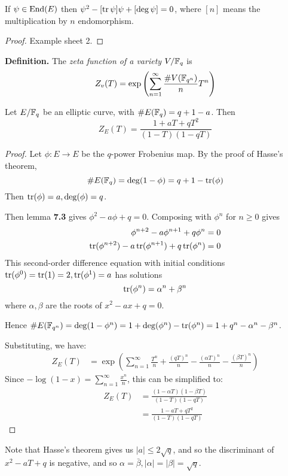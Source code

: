 \documentclass[10pt,a4paper]{article}
\begin{document}
\begin{lemma}
  If $\psi \in \operatorname{End}(E)$ then $\psi^2 - [\operatorname{tr}\psi]\psi + [\deg \psi] = 0$, where $[n]$ means the multiplication by $n$ endomorphism.
\end{lemma}
\begin{proof}
  Example sheet 2.
\end{proof}
\textbf{Definition.} The \emph{zeta function of a variety} $V/\mathbb{F}_q$ is
\[Z_v(T) = \exp\left(\sum_{n=1}^\infty \frac{\#V(\mathbb{F}_{q^n})}{n}T^n\right)\]
\begin{lemma}
  Let $E/\mathbb{F}_q$ be an elliptic curve, with $\#E(\mathbb{F}_q) = q+1-a$. Then
  \[Z_E(T) = \frac{1+aT+qT^2}{(1-T)(1-qT)}\]
\end{lemma}
\begin{proof}
  Let $\phi: E \to E$ be the $q$-power Frobenius map. By the proof of Hasse's theorem,
  \[\#E(\mathbb{F}_q) = \deg(1-\phi) = q+1-\operatorname{tr}(\phi)\]
  Then $\operatorname{tr}(\phi) = a, \deg(\phi) = q$.

  Then lemma \textbf{7.3} gives $\phi^2 - a\phi+q = 0$. Composing with $\phi^n$ for $n\geq 0$ gives
  \begin{align*}
    \phi^{n+2} - a \phi^{n+1}+q\phi^n &= 0\\
    \operatorname{tr}(\phi^{n+2}) - a \operatorname{tr}(\phi^{n+1}) + q \operatorname{tr}(\phi^n) &= 0
  \end{align*}
  This second-order difference equation with initial conditions $\operatorname{tr}(\phi^0) = \operatorname{tr}(1) = 2, \operatorname{tr}(\phi^1) = a$ has solutions
  \[\operatorname{tr}(\phi^n) = \alpha^n + \beta^n\]
  where $\alpha, \beta$ are the roots of $x^2-ax+q=0$.

  Hence $\#E(\mathbb{F}_{q^n}) = \deg(1-\phi^n) = 1+ \deg(\phi^n) - \operatorname{tr}(\phi^n) = 1+q^n-\alpha^n-\beta^n$.

  Substituting, we have:
  \begin{align*}
    Z_E(T) &= \exp\left(\sum_{n=1}^\infty \frac{T^n}{n} + \frac{(qT)^n}{n} - \frac{(\alpha T)^n}{n} - \frac{(\beta T)^n}{n}\right)
  \end{align*}
  Since $-\log(1-x) =  \sum_{n=1}^\infty \frac{x^n}{n}$, this can be simplified to:
  \begin{align*}
    Z_E(T) &= \frac{(1-\alpha T)(1-\beta T)}{(1-T)(1-qT)}\\
    &= \frac{1-aT+qT^2}{(1-T)(1-qT)}
  \end{align*}
\end{proof}
Note that Hasse's theorem gives us $|a| \leq 2\sqrt{q}$, and so the discriminant of $x^2-aT+q$ is negative, and so $\alpha = \bar{\beta}, |\alpha|=|\beta| = \sqrt{q}$.
\end{document}
